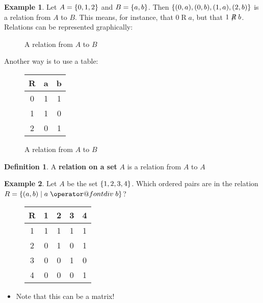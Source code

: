 \documentclass[article, 12pt]{article}
\makeatletter
\theoremstyle{definition}
\newtheorem{example}{Example}[subsection]
\newtheorem{definition}{Definition}[subsection]
\DeclarePairedDelimiter\set{\{}{\}}
\newcommand*{\bdiv}{%
  \nonscript\mskip-\medmuskip\mkern5mu%
  \mathbin{\operator@font div}\penalty900\mkern5mu%
  \nonscript\mskip-\medmuskip
}
\makeatother
\begin{document}
    \begin{example}
        Let $A = \set*{0,1,2}$ and $B=\set*{a,b}$. Then $\set*{(0,a),(0,b),(1,a),(2,b)}$ is a relation from $A$ to $B$. This means, for instance, that $0 \mathrel{R} a$, but that $1 \not \mathrel{R} b$. Relations can be represented graphically:
        \begin{figure}[H]
            \centering
            \caption{A relation from $A$ to $B$}
            \label{fig:relation}
        \end{figure}
        Another way is to use a table:
        \begin{figure}[H]
            \centering
            \begin{tabular}{c|c c}
                R & a & b \\
                \hline
                0 & 1 & 1 \\
                1 & 1 & 0 \\
                2 & 0 & 1 \\
            \end{tabular}
            \caption{A relation from $A$ to $B$}
            \label{fig:relation table}
        \end{figure}
    \end{example}
    \begin{definition}
        A \textbf{relation on a set} $A$ is a relation from $A$ to $A$
    \end{definition}
    \begin{example}
        Let $A$ be the set $\set*{1,2,3,4}$. Which ordered pairs are in the relation $R = \set*{(a,b) \mid a \bdiv b}$?
        \begin{figure}[H]
            \centering
            \begin{tabular}{c|c c c c}
                R & 1 & 2 & 3 & 4 \\
                \hline
                1 & 1 & 1 & 1 & 1 \\
                2 & 0 & 1 & 0 & 1 \\
                3 & 0 & 0 & 1 & 0 \\
                4 & 0 & 0 & 0 & 1 \\
            \end{tabular}
            \label{fig:example 1.1.2}
        \end{figure}
        \begin{itemize}
            \item Note that this can be a matrix!
        \end{itemize}
    \end{example}
\end{document}
